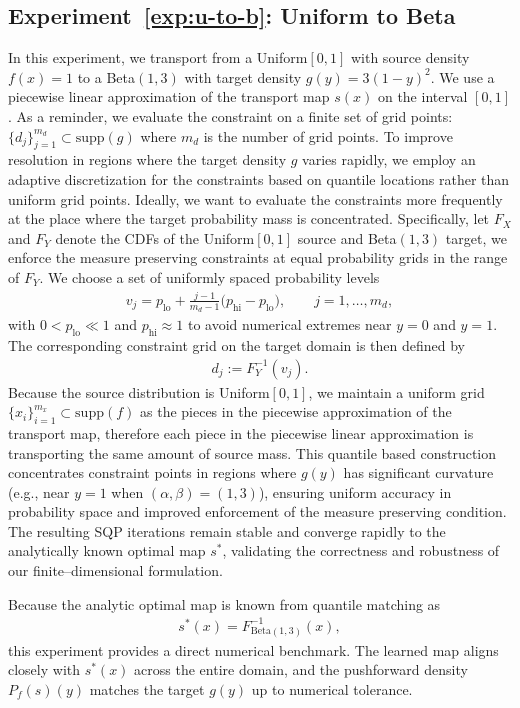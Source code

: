 \documentclass[12pt,leqno]{amsart}
\newcounter{experiment}
\begin{document}
\label{exp:u-to-b}
\subsection*{Experiment~\ref{exp:u-to-b}: Uniform to Beta}
In this experiment, we transport from a Uniform$[0,1]$ with source density $f(x)=1$ to a Beta$(1,3)$ with target density $g(y)=3(1-y)^2$. We use a piecewise linear approximation of the transport map $s(x)$ on the interval $[0,1]$. As a reminder, we evaluate the constraint on a finite set of grid points: $\{d_j\}_{j=1}^{m_d} \subset \mathrm{supp}(g)$ where $m_d$ is the number of grid points. To improve resolution in regions where the target density $g$ varies rapidly,
we employ an adaptive discretization for the constraints based on quantile locations rather than
uniform grid points. Ideally, we want to evaluate the constraints more frequently at the place where the target probability mass is concentrated. Specifically, let $F_X$ and $F_Y$
denote the CDFs of the Uniform$[0,1]$ source and Beta$(1,3)$ target, we enforce the measure preserving constraints
at equal probability grids in the range of $F_Y$. We choose a set of uniformly spaced probability levels
\begin{align*}
v_j = p_{\mathrm{lo}} +
\frac{j-1}{m_d-1}\bigl(p_{\mathrm{hi}}-p_{\mathrm{lo}}\bigr),
\qquad j=1,\ldots,m_d,    
\end{align*}
with $0<p_{\mathrm{lo}}\ll 1$ and $p_{\mathrm{hi}}\approx 1$
to avoid numerical extremes near $y=0$ and $y=1$. 
The corresponding constraint grid on the target domain is then defined by
\begin{align*}
d_j := F_Y^{-1}(v_j).
\end{align*}
Because the source distribution is Uniform$[0,1]$, we maintain a uniform
grid $\{x_i\}_{i=1}^{m_x}\subset \mathrm{supp}(f)$ as the pieces in the piecewise approximation of the transport map, therefore each piece in the piecewise linear approximation is transporting the same amount of source mass. This quantile based construction concentrates constraint points in
regions where $g(y)$ has significant curvature (e.g., near $y=1$
when $(\alpha,\beta)=(1,3)$), ensuring uniform accuracy in probability
space and improved enforcement of the measure preserving condition.
The resulting SQP iterations remain stable and converge rapidly to the
analytically known optimal map $s^*$, validating the correctness and
robustness of our finite--dimensional formulation.


Because the analytic optimal map is known from quantile matching as 
\begin{align*}
s^*(x)=F^{-1}_{\mathrm{Beta}(1,3)}(x),
\end{align*}
this experiment provides a direct numerical benchmark. The learned map aligns closely with $s^*(x)$ across the entire domain, and the pushforward density $P_f(s)(y)$ matches the target $g(y)$ up to numerical tolerance.
\end{document}
